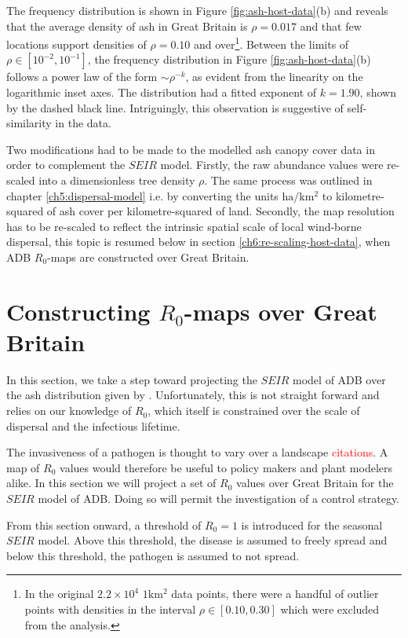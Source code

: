 The frequency distribution is shown in Figure \ref{fig:ash-host-data}(b) and reveals that the average density of ash in Great Britain is $\rho=0.017$ and that few locations support densities of $\rho=0.10$ and over\footnote{In the original $2.2\times 10^4$ $1\mathrm{km^2}$ data points, there were a handful of outlier points with densities in the interval $\rho \in [0.10, 0.30]$ which were excluded from the analysis.}. Between the limits of $\rho \in [10^{-2}, 10^{-1}]$, the frequency distribution in Figure \ref{fig:ash-host-data}(b) follows a power law of the form $\sim \rho ^{-k}$, as evident from the linearity on the logarithmic inset axes. The distribution had a fitted exponent of $k=1.90$, shown by the dashed black line. Intriguingly, this observation is suggestive of self-similarity in the data.

Two modifications had to be made to the modelled ash canopy cover data in order to complement the $SEIR$ model. Firstly, the raw abundance values were re-scaled into a dimensionless tree density $\rho$. The same process was outlined in chapter \ref{ch5:dispersal-model} i.e. by converting the units $\mathrm{ha/km^2}$ to kilometre-squared of ash cover per kilometre-squared of land. Secondly, the map resolution has to be re-scaled to reflect the intrinsic spatial scale of local wind-borne dispersal, this topic is resumed below in section \ref{ch6:re-scaling-host-data}, when ADB $R_0$-maps are constructed over Great Britain.

\section{Constructing $R_0$-maps over Great Britain}

In this section, we take a step toward projecting the $SEIR$ model of ADB over the ash distribution given by \cite{hill.data}. Unfortunately, this is not straight forward and relies on our knowledge of $R_0$, which itself is constrained over the scale of dispersal and the infectious lifetime. 

The invasiveness of a pathogen is thought to vary over a landscape \textcolor{red}{citations}. A map of $R_0$ values would therefore be useful to policy makers and plant modelers alike. In this section we will project a set of $R_0$ values over Great Britain for the $SEIR$ model of ADB. Doing so will permit the investigation of a control strategy. 

From this section onward, a threshold of $R_0 = 1$ is introduced for the seasonal $SEIR$ model. Above this threshold, the disease is assumed to freely spread and below this threshold, the pathogen is assumed to not spread. 

